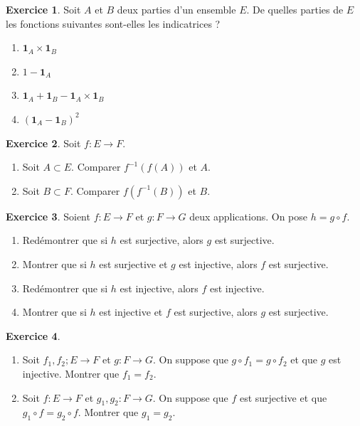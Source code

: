 \documentclass[french]{book}
\newcommand{\inv}{^{-1}}
\theoremstyle{definition}
\newtheorem{ex}{Exercice}[chapter]
\theoremstyle{theorem}
\theoremstyle{remark}
\begin{document}
\begin{ex}
	Soit $A$ et $B$ deux parties d'un ensemble $E$. De quelles parties de $E$ les fonctions suivantes sont-elles les indicatrices ?
	\begin{enumerate}
		\item $\mathbf{1}_A\times\mathbf{1}_B$
		\item $1-\mathbf{1}_A$
		\item $\mathbf{1}_A+\mathbf{1}_B-\mathbf{1}_A\times\mathbf{1}_B$
		\item $(\mathbf{1}_A-\mathbf{1}_B)^2$
	\end{enumerate}
\end{ex}

\begin{ex}
	Soit $f:E\to F$.
	\begin{enumerate}
		\item Soit $A\subset E$. Comparer $f\inv(f(A))$ et $A$.
		\item Soit $B\subset F$. Comparer $f(f\inv(B))$ et $B$.
	\end{enumerate}
\end{ex}

\begin{ex}
	Soient $f:E\to F$ et $g:F\to G$ deux applications. On pose $h=g\circ f$.
	\begin{enumerate}
		\item Redémontrer que si $h$ est surjective, alors $g$ est surjective.
		\item Montrer que si $h$ est surjective et $g$ est injective, alors $f$ est surjective.
		\item Redémontrer que si $h$ est injective, alors $f$ est injective.
		\item Montrer que si $h$ est injective et $f$ est surjective, alors $g$ est surjective.
	\end{enumerate}
\end{ex}

\begin{ex}
	\begin{enumerate}
		\item Soit $f_1,f_2;E\to F$ et $g:F\to G$. On suppose que $g\circ f_1=g\circ f_2$ et que $g$ est injective. Montrer que $f_1=f_2$.
		\item Soit $f:E\to F$ et $g_1,g_2:F\to G$. On suppose que $f$ est surjective et que $g_1\circ f=g_2\circ f$. Montrer que $g_1=g_2$.
	\end{enumerate}
\end{ex}
\end{document}
